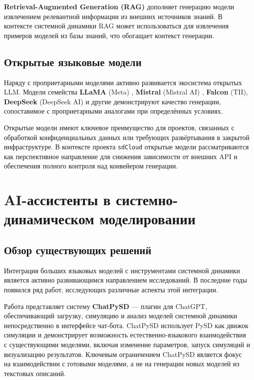 \textbf{Retrieval-Augmented Generation (RAG)} \cite{lewis2020retrieval} дополняет генерацию модели извлечением релевантной информации из внешних источников знаний. В контексте системной динамики RAG может использоваться для извлечения примеров моделей из базы знаний, что обогащает контекст генерации.

\subsection{Открытые языковые модели}

Наряду с проприетарными моделями активно развивается экосистема открытых LLM. Модели семейства \textbf{LLaMA} (Meta) \cite{touvron2023llama}, \textbf{Mistral} (Mistral AI) \cite{jiang2023mistral}, \textbf{Falcon} (TII), \textbf{DeepSeek} (DeepSeek AI) и другие демонстрируют качество генерации, сопоставимое с проприетарными аналогами при определённых условиях.

Открытые модели имеют ключевое преимущество для проектов, связанных с обработкой конфиденциальных данных или требующих развёртывания в закрытой инфраструктуре. В контексте проекта \texttt{sdCloud} открытые модели рассматриваются как перспективное направление для снижения зависимости от внешних API и обеспечения полного контроля над конвейером генерации.


\section{AI-ассистенты в системно-динамическом моделировании}

\subsection{Обзор существующих решений}

Интеграция больших языковых моделей с инструментами системной динамики является активно развивающимся направлением исследований. В последние годы появился ряд работ, исследующих различные аспекты этой интеграции.

Работа \cite{hu2025chatpysd} представляет систему \textbf{ChatPySD} --- плагин для ChatGPT, обеспечивающий загрузку, симуляцию и анализ моделей системной динамики непосредственно в интерфейсе чат-бота. ChatPySD использует PySD как движок симуляции и демонстрирует возможность естественно-языкового взаимодействия с существующими моделями, включая изменение параметров, запуск симуляций и визуализацию результатов. Ключевым ограничением ChatPySD является фокус на взаимодействии с готовыми моделями, а не на генерации новых моделей из текстовых описаний.


